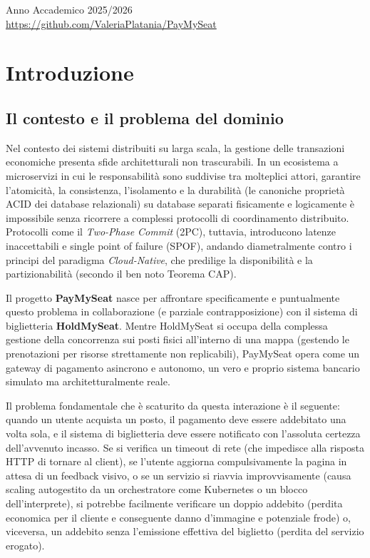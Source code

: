 \documentclass[11pt,a4paper]{report}
\begin{document}
\begin{titlepage}
\begin{center}
        \vfill
        
        {\large Anno Accademico 2025/2026} \\
        \vspace{0.5cm}
        {\small \url{https://github.com/ValeriaPlatania/PayMySeat}}
    \end{center}
\end{titlepage}

\tableofcontents
\newpage

\chapter{Introduzione}
\section{Il contesto e il problema del dominio}
Nel contesto dei sistemi distribuiti su larga scala, la gestione delle transazioni economiche presenta sfide architetturali non trascurabili. In un ecosistema a microservizi in cui le responsabilit\`a sono suddivise tra molteplici attori, garantire l'atomicit\`a, la consistenza, l'isolamento e la durabilit\`a (le canoniche propriet\`a ACID dei database relazionali) su database separati fisicamente e logicamente \`e impossibile senza ricorrere a complessi protocolli di coordinamento distribuito. Protocolli come il \textit{Two-Phase Commit} (2PC), tuttavia, introducono latenze inaccettabili e single point of failure (SPOF), andando diametralmente contro i principi del paradigma \textit{Cloud-Native}, che predilige la disponibilit\`a e la partizionabilit\`a (secondo il ben noto Teorema CAP).

Il progetto \textbf{PayMySeat} nasce per affrontare specificamente e puntualmente questo problema in collaborazione (e parziale contrapposizione) con il sistema di biglietteria \textbf{HoldMySeat}. Mentre HoldMySeat si occupa della complessa gestione della concorrenza sui posti fisici all'interno di una mappa (gestendo le prenotazioni per risorse strettamente non replicabili), PayMySeat opera come un gateway di pagamento asincrono e autonomo, un vero e proprio sistema bancario simulato ma architetturalmente reale. 

Il problema fondamentale che \`e scaturito da questa interazione \`e il seguente: quando un utente acquista un posto, il pagamento deve essere addebitato una volta sola, e il sistema di biglietteria deve essere notificato con l'assoluta certezza dell'avvenuto incasso. Se si verifica un timeout di rete (che impedisce alla risposta HTTP di tornare al client), se l'utente aggiorna compulsivamente la pagina in attesa di un feedback visivo, o se un servizio si riavvia improvvisamente (causa scaling autogestito da un orchestratore come Kubernetes o un blocco dell'interprete), si potrebbe facilmente verificare un doppio addebito (perdita economica per il cliente e conseguente danno d'immagine e potenziale frode) o, viceversa, un addebito senza l'emissione effettiva del biglietto (perdita del servizio erogato).
\end{document}
